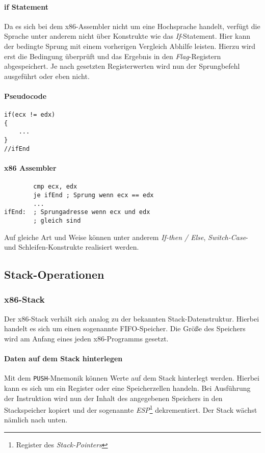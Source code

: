 \paragraph{if Statement}

Da es sich bei dem x86-Assembler nicht um eine Hochsprache handelt, verfügt die Sprache unter anderem nicht über Konstrukte wie das \textit{If}-Statement.
Hier kann der bedingte Sprung mit einem vorherigen Vergleich Abhilfe leisten.
Hierzu wird erst die Bedingung überprüft und das Ergebnis in den \textit{Flag}-Registern abgespeichert.
Je nach gesetzten Registerwerten wird nun der Sprungbefehl ausgeführt oder eben nicht.

\paragraph{Pseudocode\newline}\makebox{}
\begin{lstlisting}
if(ecx != edx)
{
    ...
}
//ifEnd
\end{lstlisting}

\paragraph{x86 Assembler\newline}\makebox{}
\begin{lstlisting}
        cmp ecx, edx
        je ifEnd ; Sprung wenn ecx == edx
        ...
ifEnd:  ; Sprungadresse wenn ecx und edx
        ; gleich sind
\end{lstlisting}

Auf gleiche Art und Weise können unter anderem \textit{If-then / Else}, \textit{Switch-Case}- und Schleifen-Konstrukte realisiert werden.


\subsection{Stack-Operationen}
\subsubsection{x86-Stack}
Der x86-Stack verhält sich analog zu der bekannten Stack-Datenstruktur. Hierbei handelt es sich um einen sogenannte FIFO-Speicher.
Die Größe des Speichers wird am Anfang eines jeden x86-Programms gesetzt.

\paragraph{Daten auf dem Stack hinterlegen\newline}
Mit dem \texttt{PUSH}-Mnemonik können Werte auf dem Stack hinterlegt werden.
Hierbei kann es sich um ein Register oder eine Speicherzellen handeln.
Bei Ausführung der Instruktion wird nun der Inhalt des angegebenen Speichers in den Stackspeicher kopiert
und der sogenannte \textit{ESP}\footnote{Register des \textit{Stack-Pointers}} dekrementiert.
Der Stack wächst nämlich nach unten.


